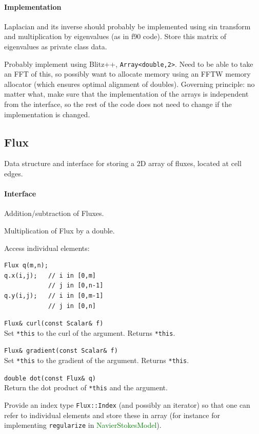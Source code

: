 \documentclass[11pt]{article}
\def\class#1{\textcolor{green}{\ttfamily\small #1}} %
\let\code\lstinline
\begin{document}
\paragraph{Implementation}
Laplacian and its inverse should probably be implemented using sin transform and multiplication by eigenvalues (as in f90 code).  Store this matrix of eigenvalues as private class data.

Probably implement using Blitz++, \code|Array<double,2>|.  Need to be able to take an FFT of this, so possibly want to allocate memory using an FFTW memory allocator (which ensures optimal alignment of doubles).  Governing principle: no matter what, make sure that the implementation of the arrays is independent from the interface, so the rest of the code does not need to change if the implementation is changed.

\subsection{Flux}
Data structure and interface for storing a 2D array of fluxes, located at cell edges.

\paragraph{Interface}
\begin{description}
	\item Addition/subtraction of Fluxes.
	\item Multiplication of Flux by a double.
	\item Access individual elements:
\begin{lstlisting}
Flux q(m,n);
q.x(i,j);   // i in [0,m]
            // j in [0,n-1]
q.y(i,j);   // i in [0,m-1]
		    // j in [0,n]
\end{lstlisting}
	\item \code|Flux& curl(const Scalar& f)|\\
	Set \code|*this| to the curl of the argument.  Returns \code|*this|.
	\item \code|Flux& gradient(const Scalar& f)|\\
	Set \code|*this| to the gradient of the argument.  Returns \code|*this|.
	\item \code|double dot(const Flux& q)|\\
	Return the dot product of \code|*this| and the argument.
	\item Provide an index type \code|Flux::Index| (and possibly an iterator) so that one can refer to individual elements and store these in array (for instance for implementing \code|regularize| in \class{NavierStokesModel}).
\end{description}
\end{document}
